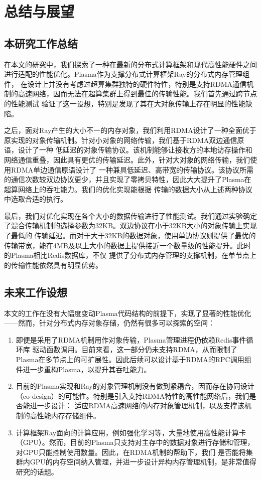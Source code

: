 \chapter{总结与展望}

\section{本研究工作总结}

在本文的研究中，我们探索了一种在最新的分布式计算框架和现代高性能硬件之间进行适配的性能优化。Plasma作为支撑分布式计算框架Ray的分布式内存管理组件，
在设计上并没有考虑过超算集群独特的硬件特性，特别是支持RDMA通信机制的高速网络，因而无法在超算集群上得到最佳的传输性能。我们首先通过跨节点的性能测试
验证了这一设想，特别是发现了其在大对象传输上存在明显的性能缺陷。

之后，面对Ray产生的大小不一的内存对象，我们利用RDMA设计了一种全面优于原实现的对象传输机制。针对小对象的网络传输，我们基于RDMA双边通信原语，设计了一种
低延迟的对象传输协议。该机制能够让接收方的本地访存操作和网络通信重叠，因此具有更优的传输延迟。此外，针对大对象的网络传输，我们使用RDMA单边通信原语设计了
一种兼具低延迟、高带宽的传输协议。该协议所需的通信次数较双边协议更少，并且实现了零拷贝特性，因此大大提升了Plasma在超算网络上的吞吐能力。我们的优化实现能根据
传输的数据大小从上述两种协议中选取合适的执行。

最后，我们对优化实现在各个大小的数据传输进行了性能测试。我们通过实验确定了混合传输机制的选择参数为32KB。双边协议在小于32KB大小的对象传输上实现了最低的
传输延迟。而对于大于32KB的数据对象，使用单边协议则提供了最优的传输带宽，能在4MB及以上大小的数据上提供接近一个数量级的性能提升。此时的Plasma相比Redis数据库，不仅
提供了分布式内存管理的支撑机制，在单节点上的传输性能依然具有明显优势。

\section{未来工作设想}

本文的工作在没有大幅度变动Plasma代码结构的前提下，实现了显著的性能优化——然而，针对分布式内存对象存储，仍然有很多可以探索的空间：

\begin{enumerate}
	\item 即便是采用了RDMA机制用作对象传输，Plasma管理进程仍依赖Redis事件循环库\cite{ae}
	驱动函数调用。目前来看，这一部分仍未支持RDMA，从而限制了Plasma在多节点上的可扩展性。因此后续可以设计基于RDMA的RPC调用组件进一步重构Plasma，以提升其吞吐能力。
	\item 目前的Plasma实现和Ray的对象管理机制\cite{wang2021ownership}没有做到紧耦合，因而存在协同设计（co-design）的可能性。特别是引入支持RDMA特性的高性能网络后，我们是否能进一步设计：
	适应RDMA高速网络的内存对象管理机制，以及支撑该机制的高性能内存存储组件。
	\item 计算框架Ray面向的计算应用，例如强化学习等，大量地使用高性能计算卡（GPU）。然而，目前的Plasma只支持对主存中的数据对象进行存储和管理，对GPU只能控制使用数量。因此，在RDMA机制的帮助下，我们
	是否能将集群内GPU的内存空间纳入管理，并进一步设计异构内存管理机制，是非常值得研究的话题。
\end{enumerate}